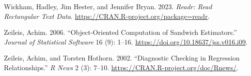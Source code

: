 \documentclass[
]{article}
\newlength{\cslhangindent}
\newlength{\cslentryspacingunit} %
\newenvironment{CSLReferences}[2] %
 {%
  \setlength{\parindent}{0pt}
  \ifodd #1
  \let\oldpar\par
  \def\par{\hangindent=\cslhangindent\oldpar}
  \fi
  \setlength{\parskip}{#2\cslentryspacingunit}
 }%
 {}
\begin{document}
\begin{CSLReferences}{1}{0}
\leavevmode{}%
Wickham, Hadley, Jim Hester, and Jennifer Bryan. 2023. \emph{Readr: Read
Rectangular Text Data}. \url{https://CRAN.R-project.org/package=readr}.

\leavevmode{}%
Zeileis, Achim. 2006. {``Object-Oriented Computation of Sandwich
Estimators.''} \emph{Journal of Statistical Software} 16 (9): 1--16.
\url{https://doi.org/10.18637/jss.v016.i09}.

\leavevmode{}%
Zeileis, Achim, and Torsten Hothorn. 2002. {``Diagnostic Checking in
Regression Relationships.''} \emph{R News} 2 (3): 7--10.
\url{https://CRAN.R-project.org/doc/Rnews/}.

\end{CSLReferences}
\end{document}
